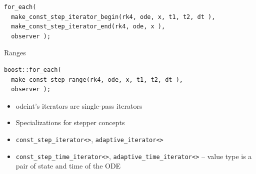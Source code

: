 \begin{frame}[fragile]


\vspace{2ex}

\begin{lstlisting}[basicstyle=\scriptsize\ttfamily]
for_each(
  make_const_step_iterator_begin(rk4, ode, x, t1, t2, dt ),
  make_const_step_iterator_end(rk4, ode, x ),
  observer );
\end{lstlisting}

\vspace{2ex}

Ranges
\begin{lstlisting}[basicstyle=\scriptsize\ttfamily]
boost::for_each(
  make_const_step_range(rk4, ode, x, t1, t2, dt ),
  observer );
\end{lstlisting}




\vspace{2ex}

{\small
\begin{itemize}
\item odeint's iterators are single-pass iterators
\item Specializations for stepper concepts
\item {\tt const\_step\_iterator<>}, {\tt adaptive\_iterator<>}
\item {\tt const\_step\_time\_iterator<>}, {\tt adaptive\_time\_iterator<>} -- value type is a pair of state and time of the ODE
\end{itemize}
}



\end{frame}






